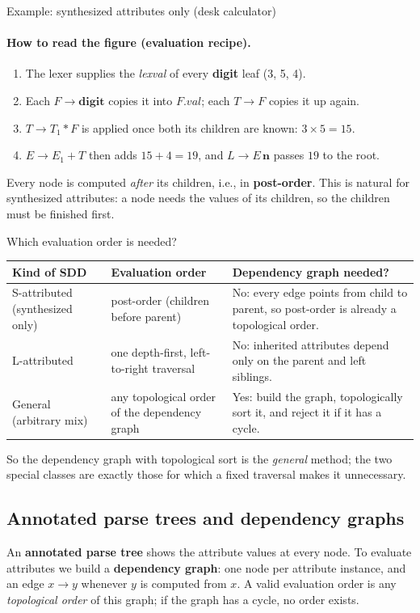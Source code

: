 \documentclass[11pt,a4paper]{article}
\newcommand{\at}[2]{\ensuremath{#1.\mathit{#2}}}
\begin{document}
\begin{examplebox}{Example: synthesized attributes only (desk calculator)}
\paragraph{How to read the figure (evaluation recipe).}
\begin{enumerate}[nosep]
\item The lexer supplies the \textit{lexval} of every \textbf{digit} leaf (3, 5, 4).
\item Each $F \to \mathbf{digit}$ copies it into \at{F}{val}; each $T \to F$ copies it up again.
\item $T \to T_1 * F$ is applied once both its children are known: $3 \times 5 = 15$.
\item $E \to E_1 + T$ then adds $15 + 4 = 19$, and $L \to E\,\mathbf{n}$ passes $19$ to the root.
\end{enumerate}
Every node is computed \emph{after} its children, i.e., in \textbf{post-order}. This is natural for synthesized attributes: a node needs the values of its children, so the children must be finished first.
\end{examplebox}

\begin{notebox}{Which evaluation order is needed?}
\begin{center}
\small
\begin{tabular}{@{}L{3.3cm} L{4.2cm} L{6cm}@{}}
\toprule
\textbf{Kind of SDD} & \textbf{Evaluation order} & \textbf{Dependency graph needed?} \\ \midrule
S-attributed (synthesized only) & post-order (children before parent) & No: every edge points from child to parent, so post-order is already a topological order. \\
L-attributed & one depth-first, left-to-right traversal & No: inherited attributes depend only on the parent and left siblings. \\
General (arbitrary mix) & any topological order of the dependency graph & Yes: build the graph, topologically sort it, and reject it if it has a cycle. \\ \bottomrule
\end{tabular}
\end{center}
So the dependency graph with topological sort is the \emph{general} method; the two special classes are exactly those for which a fixed traversal makes it unnecessary.
\end{notebox}

\subsection{Annotated parse trees and dependency graphs}
An \textbf{annotated parse tree} shows the attribute values at every node. To evaluate attributes we build a \textbf{dependency graph}: one node per attribute instance, and an edge $x \to y$ whenever $y$ is computed from $x$. A valid evaluation order is any \emph{topological order} of this graph; if the graph has a cycle, no order exists.
\end{document}
